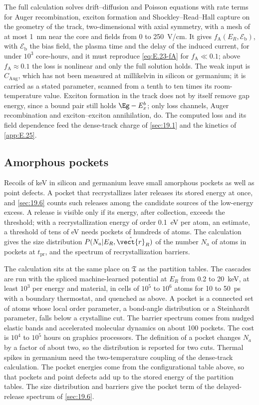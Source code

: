 The full calculation solves drift--diffusion and Poisson equations with rate terms for Auger recombination, exciton formation and Shockley--Read--Hall capture on the geometry of the track, two-dimensional with axial symmetry, with a mesh of at most \SI{1}{nm} near the core and fields from 0 to \SI{250}{V/cm}. It gives $f_{\mathrm{A}}(E_R, \mathcal{E}_{\mathrm{b}})$, with $\mathcal{E}_{\mathrm{b}}$ the bias field, the plasma time and the delay of the induced current, for under $10^3$ core-hours, and it must reproduce \cref{eq:E.23-fA} for $f_{\mathrm{A}} \ll 0.1$; above $f_{\mathrm{A}} \approx 0.1$ the loss is nonlinear and only the full solution holds. The weak input is $C_{\mathrm{Aug}}$, which has not been measured at millikelvin in silicon or germanium; it is carried as a stated parameter, scanned from a tenth to ten times its room-temperature value. Exciton formation in the track does not by itself remove gap energy, since a bound pair still holds $\Eg - E_x^b$; only loss channels, Auger recombination and exciton--exciton annihilation, do. The computed loss and its field dependence feed the dense-track charge of \cref{sec:19.1} and the kinetics of \cref{app:E.25}.

\subsection{Amorphous pockets}

Recoils of keV in silicon and germanium leave small amorphous pockets as well as point defects. A pocket that recrystallizes later releases its stored energy at once, and \cref{sec:19.6} counts such releases among the candidate sources of the low-energy excess. A release is visible only if its energy, after collection, exceeds the threshold; with a recrystallization energy of order \SI{0.1}{eV} per atom, an estimate, a threshold of tens of eV needs pockets of hundreds of atoms. The calculation gives the size distribution $P(N_a|E_R, \hat{\vect{r}}_R)$ of the number $N_a$ of atoms in pockets at $t_{\mathrm{pr}}$, and the spectrum of recrystallization barriers.

The calculation sits at the same place on $\mathfrak{T}$ as the partition tables. The cascades are run with the spliced machine-learned potential at $E_R$ from 0.2 to \SI{20}{keV}, at least $10^3$ per energy and material, in cells of $10^5$ to $10^6$ atoms for 10 to \SI{50}{ps} with a boundary thermostat, and quenched as above. A pocket is a connected set of atoms whose local order parameter, a bond-angle distribution or a Steinhardt parameter, falls below a crystalline cut. The barrier spectrum comes from nudged elastic bands and accelerated molecular dynamics on about 100 pockets. The cost is $10^4$ to $10^5$ hours on graphics processors. The definition of a pocket changes $N_a$ by a factor of about two, so the distribution is reported for two cuts. Thermal spikes in germanium need the two-temperature coupling of the dense-track calculation. The pocket energies come from the configurational table above, so that pockets and point defects add up to the stored energy of the partition tables. The size distribution and barriers give the pocket term of the delayed-release spectrum of \cref{sec:19.6}.

